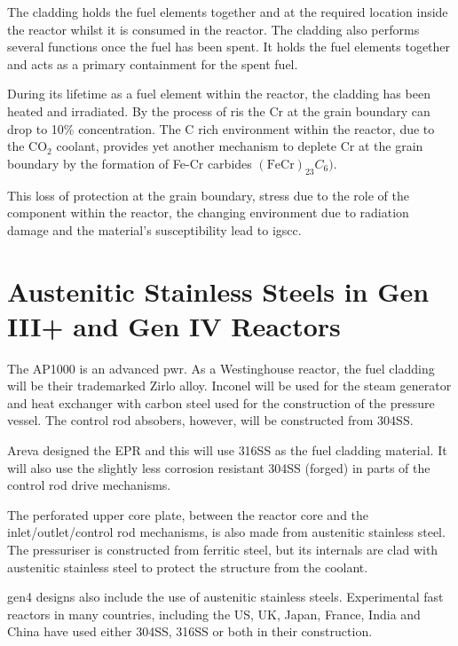 The cladding holds the fuel elements together and at the required location inside the reactor whilst it is consumed in the reactor.  The cladding also performs several functions once the fuel has been spent.  It holds the fuel elements together and acts as a primary containment for the spent fuel\cite{agrfuelstorage}.

During its lifetime as a fuel element within the reactor, the cladding has been heated and irradiated.  By the process of \acrshort{ris} the Cr at the grain boundary can drop to 10\% concentration\cite{agrigscc}.  The C rich environment within the reactor, due to the $\text{CO}_{2}$ coolant, provides yet another mechanism to deplete Cr at the grain boundary by the formation of Fe-Cr carbides $(\text{Fe}\text{Cr})_{23} C_{6})$.  

This loss of protection at the grain boundary, stress due to the role of the component within the reactor, the changing environment due to radiation damage and the material's susceptibility lead to \acrshort{igscc}.




\FloatBarrier



\section[SS in Gen III+ and Gen IV]{Austenitic Stainless Steels in Gen III+ and Gen IV Reactors}

The AP1000 is an advanced \acrshort{pwr}.  As a Westinghouse reactor, the fuel cladding will be their trademarked Zirlo alloy.  Inconel will be used for the steam generator and heat exchanger with carbon steel used for the construction of the pressure vessel.  The control rod absobers, however, will be constructed from \gls{304SS}\cite{ap1000mat}.

Areva designed the EPR and this will use \gls{316SS} as the fuel cladding material.  It will also use the slightly less corrosion resistant \gls{304SS} (forged) in parts of the control rod drive mechanisms\cite{eprmat}.

The perforated upper core plate, between the reactor core and the inlet/outlet/control rod mechanisms, is also made from austenitic stainless steel.  The pressuriser is constructed from ferritic steel, but its internals are clad with austenitic stainless steel to protect the structure from the coolant.

\acrshort{gen4} designs also include the use of austenitic stainless steels.  Experimental fast reactors in many countries, including the US, UK, Japan, France, India and China have used either \gls{304SS}, \gls{316SS} or both in their construction.

